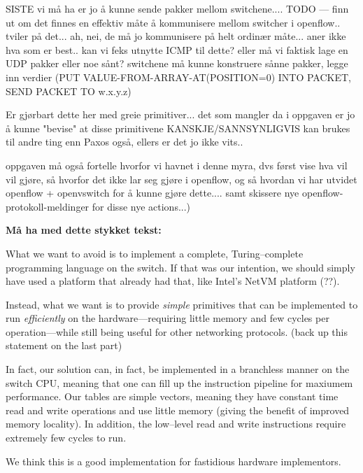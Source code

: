 SISTE vi må ha er jo å kunne sende pakker mellom switchene....
TODO --- finn ut om det finnes en effektiv måte å kommunisere mellom
switcher i openflow.. tviler på det... ah, nei, de må jo kommunisere på helt
ordinær måte... aner ikke hva som er best.. kan vi feks utnytte ICMP til
dette? eller må vi faktisk lage en UDP pakker eller noe sånt?
switchene må kunne konstruere sånne pakker, legge inn verdier
(PUT VALUE-FROM-ARRAY-AT(POSITION=0) INTO PACKET, SEND PACKET TO w.x.y.z)

Er gjørbart dette her med greie primitiver... det som mangler da i oppgaven
er jo å kunne "bevise" at disse primitivene KANSKJE/SANNSYNLIGVIS kan brukes
til andre ting enn Paxos også, ellers er det jo ikke vits..

oppgaven må også fortelle hvorfor vi havnet i denne myra, dvs først vise hva
vil vil gjøre, så hvorfor det ikke lar seg gjøre i openflow, og så hvordan
vi har utvidet openflow + openvswitch for å kunne gjøre dette....
samt skissere nye openflow-protokoll-meldinger for disse nye actions...)

\textbf{Må ha med dette stykket tekst:}

What we want to avoid is to implement a complete, Turing--complete
programming language on the switch.  If that was our intention, we should
simply have used a platform that already had that, like Intel's NetVM
platform (??).

Instead, what we want is to provide \textit{simple} primitives that can be
implemented to run \textit{efficiently} on the hardware---requiring little
memory and few cycles per operation---while still being useful for other
networking protocols. (back up this statement on the last part)

In fact, our solution can, in fact, be implemented in a branchless manner on the
switch CPU, meaning that one can fill up the instruction pipeline for
maxiumem performance.  Our tables are simple vectors, meaning they
have constant time read and write operations and use little memory
(giving the benefit of improved memory locality).  In addition, the
low--level read and write instructions require extremely few cycles to run.

We think this is a good implementation for fastidious hardware implementors.

